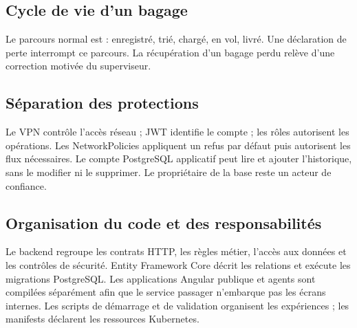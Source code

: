 \documentclass[11pt]{extarticle}
\begin{document}
\subsection{Cycle de vie d'un bagage}
Le parcours normal est : enregistré, trié, chargé, en vol, livré. Une déclaration de perte interrompt ce parcours. La récupération d'un bagage perdu relève d'une correction motivée du superviseur.
\subsection{Séparation des protections}
Le VPN contrôle l'accès réseau ; JWT identifie le compte ; les rôles autorisent les opérations. Les NetworkPolicies appliquent un refus par défaut puis autorisent les flux nécessaires. Le compte PostgreSQL applicatif peut lire et ajouter l'historique, sans le modifier ni le supprimer. Le propriétaire de la base reste un acteur de confiance.

\subsection{Organisation du code et des responsabilités}
Le backend regroupe les contrats HTTP, les règles métier, l'accès aux données et les contrôles de sécurité. Entity Framework Core décrit les relations et exécute les migrations PostgreSQL. Les applications Angular publique et agents sont compilées séparément afin que le service passager n'embarque pas les écrans internes. Les scripts de démarrage et de validation organisent les expériences ; les manifests déclarent les ressources Kubernetes.
\end{document}
